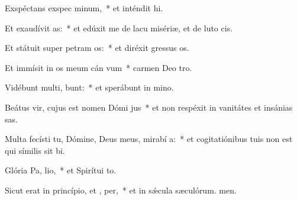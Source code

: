 \item Exspéctans exspec minum,~* et inténdit hi.
\item Et exaudívit  as:~* et edúxit me de lacu misériæ, et de luto cis.
\item Et státuit super petram  os:~* et diréxit gressus os.
\item Et immísit in os meum cán vum~* carmen Deo tro.
\item Vidébunt multi,  bunt:~* et sperábunt in mino.
\item Beátus vir, cujus est nomen Dómi  jus~* et non respéxit in vanitátes et insánias sas.
\item Multa fecísti tu, Dómine, Deus meus, mirabí a:~* et cogitatiónibus tuis non est qui símilis sit bi.
\item Glória Pa,  lio,~* et Spirítui to.
\item Sicut erat in princípio, et ,  per,~* et in sǽcula sæculórum. men.
